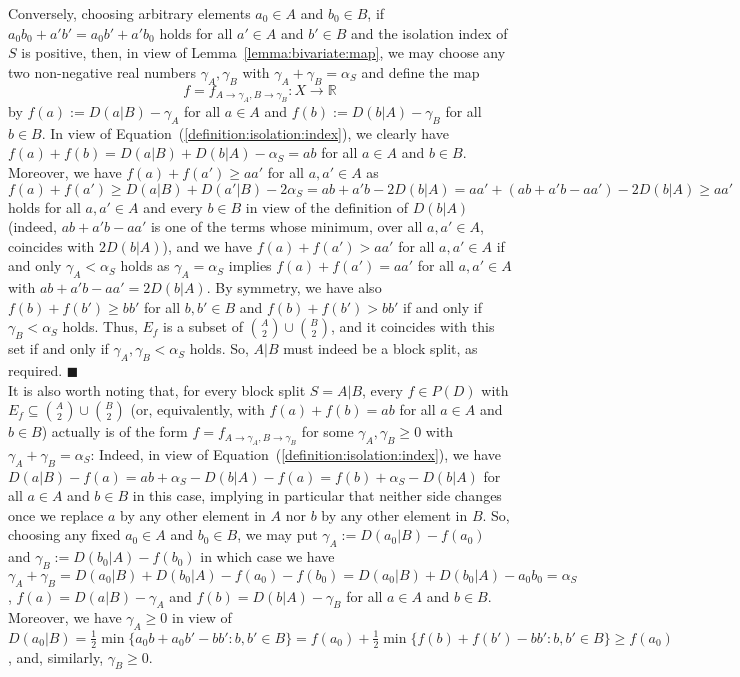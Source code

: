 \documentclass[12pt]{article}
\newcommand{\R}{{\mathbb R}}
\newcommand{\ra}{\rightarrow}
\begin{document}
Conversely, choosing arbitrary elements \(a_0 \in A\) and \(b_0 \in B\),
if $a_0b_0+a'b'=a_0b'+a'b_0$ holds for all $a'\in A$ and $b'\in B$ and the isolation index of $S$ is positive,
then, in view of Lemma~\ref{lemma:bivariate:map},  
we may choose any two non-negative real numbers $\gamma_A,\gamma_B$ with $\gamma_A+\gamma_B=\alpha_S$ and 
define the map 
\begin{equation}
\label{equation:split:map}
f=f_{A\ra\gamma_A,B\ra\gamma_B}:X\ra \R
\end{equation} 
by $f(a):=D(a|B) - \gamma_A$ for all $a\in A$ and 
$f(b):=D(b|A) - \gamma_B$ for all 
$b\in B$. In view of Equation~(\ref{definition:isolation:index}), we clearly have
$f(a)+f(b)=D(a|B) + D(b|A) - \alpha_S =ab$ for all  
$a\in A$ and $b\in B$.
Moreover, we have $f(a)+f(a')\ge aa'$ for all  
 $a,a'\in A$ as
$f(a)+f(a')\ge  D(a|B) +D(a'|B) -  2\alpha_S 
 = ab + a'b - 2D(b|A)
= aa' + (ab + a'b - aa')
 - 2D(b|A) \ge aa'$ holds for all  
 $a,a'\in A$ and every $b\in B$ in view of the definition of $D(b|A)$ \big(indeed, $ab + a'b - aa'$ is one of the terms whose minimum, over all $a,a'\in A$, coincides with $2D(b|A)$\big), and we have  $f(a)+f(a')> aa'$ for all  
 $a,a'\in A$ if and only 
 $\gamma_A<\alpha_S$
 holds as  $\gamma_A=\alpha_S$ implies $f(a)+f(a')= aa'$ for all $a,a'\in A$ with $ab + a'b - aa'
 =2D(b|A)$. By symmetry, we have also $f(b)+f(b')\ge bb'$ for all  
 $b,b'\in B$ and $f(b)+f(b') > bb'$ if and only if
 $\gamma_B<\alpha_S$
 holds. Thus, $E_f$ is a subset of $\binom{A}{2} \cup \binom{B}{2}$, and it coincides with this set if and only if $ \gamma_A,  \gamma_B< \alpha_S$ holds. 
So, $A|B$ must indeed be a block split, as required.
\hfill\(\blacksquare\)\\
 
It is also worth noting that, for every block split \(S=A|B\), every 
$f\in P(D)$ with $E_f\subseteq \binom{A}{2} \cup \binom{B}{2}$ (or, 
equivalently, with $f(a)+f(b)=ab$ for all $a\in A$ and  $b \in B$) actually is of the 
form $f=f_{A\ra\gamma_A,B\ra\gamma_B}$ for some 
$\gamma_A,\gamma_B\ge 0$ with $\gamma_A+\gamma_B=\alpha_S$: Indeed, 
in view of Equation~(\ref{definition:isolation:index}),
we have $D(a|B)-f(a)= ab +\alpha_S - D(b|A)  - f(a) = f(b) +\alpha_S - D(b|A)$ for 
all  $a\in A$ and $b\in B$ in this case, implying in particular that neither side 
changes once we replace $a$ by any other element in $A$ nor $b$ by any other element 
in $B$. So, choosing any fixed $a_0\in A$ and $b_0\in B$, we may put 
$\gamma_A:=D(a_0|B)-f(a_0)$ and $\gamma_B
 :=D(b_0|A)-f(b_0)$ in which case we have
 $\gamma_A+\gamma_B=D(a_0|B)+D(b_0|A)-f(a_0)-f(b_0)=D(a_0|B)+D(b_0|A)-a_0b_0=\alpha_S$, 
$f(a) = D(a|B)-\gamma_A$ and $f(b) = D(b|A)-\gamma_B$ for all $a\in A$ and  $b \in B$.
Moreover, we have $\gamma_A\ge 0$ in view of 
$D(a_0|B) = \frac{1}{2} \min\{a_0b+a_0b' - bb': b,b' \in B\}= f(a_0) +\frac{1}{2} \min\{f(b)+f(b') - bb': b,b' \in B\}\ge f(a_0)$,
and, similarly, \(\gamma_B \geq 0\). 
\end{document}
